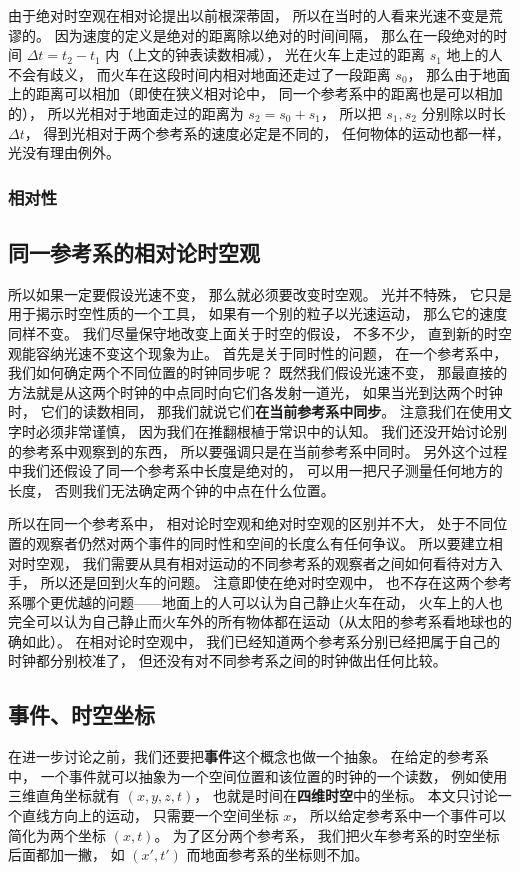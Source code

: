 由于绝对时空观在相对论提出以前根深蒂固， 所以在当时的人看来光速不变是荒谬的。 因为速度的定义是绝对的距离除以绝对的时间间隔， 那么在一段绝对的时间 $\Delta t = t_2 - t_1$ 内（上文的钟表读数相减）， 光在火车上走过的距离 $s_1$ 地上的人不会有歧义， 而火车在这段时间内相对地面还走过了一段距离 $s_0$， 那么由于地面上的距离可以相加（即使在狭义相对论中， 同一个参考系中的距离也是可以相加的）， 所以光相对于地面走过的距离为 $s_2 = s_0 + s_1$， 所以把 $s_1, s_2$ 分别除以时长 $\Delta t$， 得到光相对于两个参考系的速度必定是不同的， 任何物体的运动也都一样， 光没有理由例外。

\subsubsection{相对性}

\subsection{同一参考系的相对论时空观}
所以如果一定要假设光速不变， 那么就必须要改变时空观。 光并不特殊， 它只是用于揭示时空性质的一个工具， 如果有一个别的粒子以光速运动， 那么它的速度同样不变。 我们尽量保守地改变上面关于时空的假设， 不多不少， 直到新的时空观能容纳光速不变这个现象为止。 首先是关于同时性的问题， 在一个参考系中， 我们如何确定两个不同位置的时钟同步呢？ 既然我们假设光速不变， 那最直接的方法就是从这两个时钟的中点同时向它们各发射一道光， 如果当光到达两个时钟时， 它们的读数相同， 那我们就说它们\textbf{在当前参考系中同步}。 注意我们在使用文字时必须非常谨慎， 因为我们在推翻根植于常识中的认知。 我们还没开始讨论别的参考系中观察到的东西， 所以要强调只是在当前参考系中同时。 另外这个过程中我们还假设了同一个参考系中长度是绝对的， 可以用一把尺子测量任何地方的长度， 否则我们无法确定两个钟的中点在什么位置。

所以在同一个参考系中， 相对论时空观和绝对时空观的区别并不大， 处于不同位置的观察者仍然对两个事件的同时性和空间的长度么有任何争议。 所以要建立相对时空观， 我们需要从具有相对运动的不同参考系的观察者之间如何看待对方入手， 所以还是回到火车的问题。 注意即使在绝对时空观中， 也不存在这两个参考系哪个更优越的问题——地面上的人可以认为自己静止火车在动， 火车上的人也完全可以认为自己静止而火车外的所有物体都在运动（从太阳的参考系看地球也的确如此）。 在相对论时空观中， 我们已经知道两个参考系分别已经把属于自己的时钟都分别校准了， 但还没有对不同参考系之间的时钟做出任何比较。

\subsection{事件、时空坐标}
在进一步讨论之前，我们还要把\textbf{事件}这个概念也做一个抽象。 在给定的参考系中， 一个事件就可以抽象为一个空间位置和该位置的时钟的一个读数， 例如使用三维直角坐标就有 $(x, y, z, t)$， 也就是时间在\textbf{四维时空}中的坐标。 本文只讨论一个直线方向上的运动， 只需要一个空间坐标 $x$， 所以给定参考系中一个事件可以简化为两个坐标 $(x, t)$。 为了区分两个参考系， 我们把火车参考系的时空坐标后面都加一撇， 如 $(x', t')$ 而地面参考系的坐标则不加。

